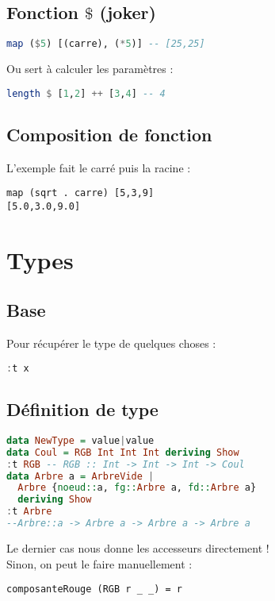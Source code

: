         \subsection{Fonction $\$$ (joker)}
            \begin{lstlisting}[language=Haskell]
map ($5) [(carre), (*5)] -- [25,25]
            \end{lstlisting}
            Ou sert à calculer les paramètres :
            \begin{lstlisting}[language=Haskell]
length $ [1,2] ++ [3,4] -- 4
            \end{lstlisting}
        \subsection{Composition de fonction}
            L'exemple fait le carré puis la racine :
            \begin{lstlisting}
map (sqrt . carre) [5,3,9]
[5.0,3.0,9.0]
            \end{lstlisting}




    \section{Types}
        \subsection{Base}
            Pour récupérer le type de quelques choses :
            \begin{lstlisting}[language=Haskell]
:t x
            \end{lstlisting}
        \subsection{Définition de type}
            \begin{lstlisting}[language=Haskell]
data NewType = value|value
data Coul = RGB Int Int Int deriving Show
:t RGB -- RGB :: Int -> Int -> Int -> Coul
data Arbre a = ArbreVide |
  Arbre {noeud::a, fg::Arbre a, fd::Arbre a}
  deriving Show
:t Arbre
--Arbre::a -> Arbre a -> Arbre a -> Arbre a
            \end{lstlisting}
            Le dernier cas nous donne les accesseurs directement !\\Sinon, on peut le faire manuellement :
            \begin{lstlisting}
composanteRouge (RGB r _ _) = r
            \end{lstlisting}
